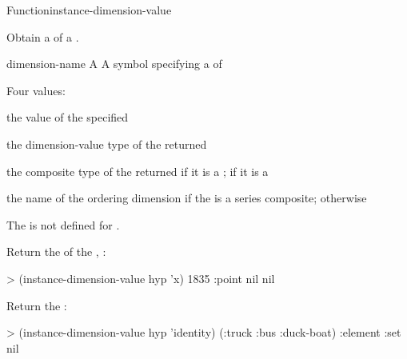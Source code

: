 \documentclass[10pt,twoside,english,pdftex]{article}
\begin{document}

\begin{functiondoc}{Function}{instance-dimension-value}%
  { \returns{} 
  \mbox{}}
%
%

\fnsyntax

\fnpurpose Obtain a  of a .

\fnpackage {}

\fnmodule {}

\fnargs
\begin{args}{dimension-name}
 A 
 A symbol specifying a  of
\end{args}

\fnreturns Four values: 
\begin{tightitemize}
\item the value of the specified 
\item the dimension-value type of the returned 
\item the composite type of the returned  if it is a
  ; \nil{} if it is a
\item the name of the ordering dimension if the  is a
  series composite; \nil{} otherwise
\end{tightitemize}

\fnerrors The   is not defined for
. 

\fnexamples
Return the   of the ,
:
\begin{example}
> (instance-dimension-value hyp 'x)
1835
:point
nil
nil
\end{example}
Return the  :
\begin{example}
> (instance-dimension-value hyp 'identity)
(:truck :bus :duck-boat)
:element
:set
nil
\end{example}

\end{functiondoc}
\end{document}
